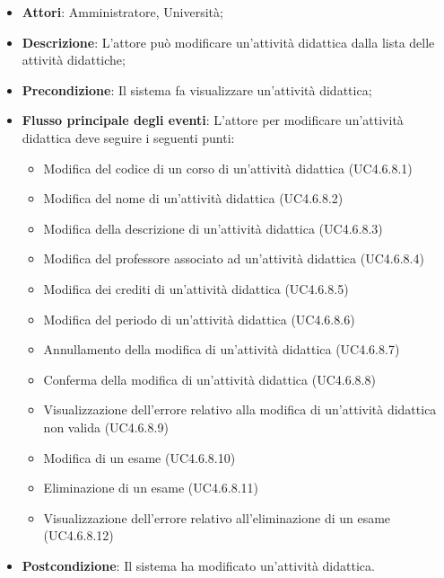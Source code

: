 \begin{itemize}
\item \textbf{Attori}: Amministratore, Università;
\item \textbf{Descrizione}: L'attore può modificare un’attività didattica dalla lista delle attività didattiche;

\item \textbf{Precondizione}: Il sistema fa visualizzare un'attività didattica;

\item \textbf{Flusso principale degli eventi}: L'attore per modificare un’attività didattica deve seguire i seguenti punti:

\begin{itemize}
\item Modifica del codice di un corso di un'attività didattica (UC4.6.8.1)
\item Modifica del nome di un'attività didattica (UC4.6.8.2)
\item Modifica della descrizione di un'attività didattica (UC4.6.8.3)
\item Modifica del professore associato ad un'attività didattica (UC4.6.8.4)
\item Modifica dei crediti di un'attività didattica (UC4.6.8.5)
\item Modifica del periodo di un'attività didattica (UC4.6.8.6)
\item Annullamento della modifica di un'attività didattica (UC4.6.8.7)
\item Conferma della modifica di un'attività didattica (UC4.6.8.8)
\item Visualizzazione dell'errore relativo alla modifica di un’attività didattica non valida (UC4.6.8.9)
\item Modifica di un esame (UC4.6.8.10)
\item Eliminazione di un esame (UC4.6.8.11)
\item Visualizzazione dell'errore relativo all'eliminazione di un esame (UC4.6.8.12)
\end{itemize}
\item \textbf{Postcondizione}: Il sistema ha modificato un’attività didattica.

\end{itemize}
